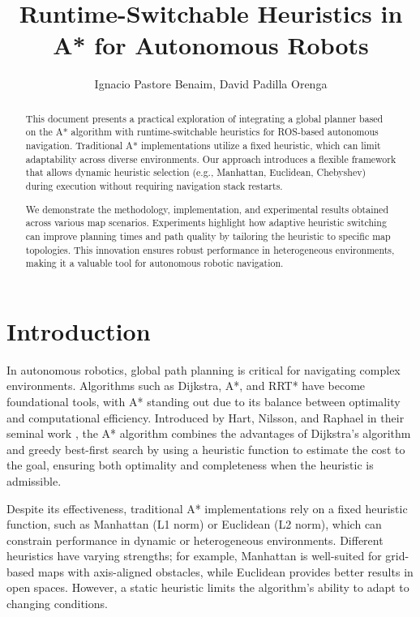 \documentclass[letterpaper, 10 pt, conference]{ieeeconf}
\title{\LARGE\bf Runtime-Switchable Heuristics in A* for Autonomous Robots}
\author{\centering Ignacio Pastore Benaim, David Padilla Orenga}
\begin{document}
\setlength{\parskip}{0.5em} %
\maketitle

\begin{abstract}
This document presents a practical exploration of integrating a global planner based on the A* algorithm with runtime-switchable heuristics for ROS-based autonomous navigation. Traditional A* implementations utilize a fixed heuristic, which can limit adaptability across diverse environments. Our approach introduces a flexible framework that allows dynamic heuristic selection (e.g., Manhattan, Euclidean, Chebyshev) during execution without requiring navigation stack restarts.

We demonstrate the methodology, implementation, and experimental results obtained across various map scenarios. Experiments highlight how adaptive heuristic switching can improve planning times and path quality by tailoring the heuristic to specific map topologies. This innovation ensures robust performance in heterogeneous environments, making it a valuable tool for autonomous robotic navigation.
\end{abstract}

\section{Introduction}\label{sec:intro}

In autonomous robotics, global path planning is critical for navigating complex environments. 
Algorithms such as Dijkstra, A*, and RRT* have become foundational tools, with A* standing out due to 
its balance between optimality and computational efficiency. Introduced by Hart, Nilsson, and Raphael in
 their seminal work \cite{hart1968formal}, the A* algorithm combines the advantages of Dijkstra's 
 algorithm and greedy best-first search by using a heuristic function to estimate the cost to the goal, 
 ensuring both optimality and completeness when the heuristic is admissible.

Despite its effectiveness, traditional A* implementations rely on a fixed heuristic function, such as Manhattan (L1 norm) or Euclidean (L2 norm), which can constrain performance in dynamic or heterogeneous environments. Different heuristics have varying strengths; for example, Manhattan is well-suited for grid-based maps with axis-aligned obstacles, while Euclidean provides better results in open spaces. However, a static heuristic limits the algorithm's ability to adapt to changing conditions.
\end{document}
